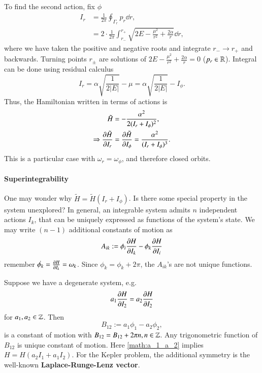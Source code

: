To find the second action, fix $\phi$
\begin{align*}
	I_r &= \frac{1}{2\pi} \oint_{\Gamma_r} p_r \dd{r},	 \\
			 &= 2 \cdot \frac{1}{2\pi}\int_{r_-}^{r_+} \sqrt{2E - \frac{\mu^2}{r^2} + \frac{2\alpha}{r}} \dd{r},
\end{align*}
where we have taken the positive and negative roots and integrate $r_- \rightarrow r_+$ and backwards. Turning points $r_\pm$ are solutions of $2E - \frac{\mu^2}{r^2} + \frac{2\alpha}{r} = 0$ ($p_r \in \mathbb{R}$). Integral can be done using residual calculus 
\begin{equation*}
	I_r = \alpha \sqrt{\frac{1}{2 |E|}} - \mu = \alpha \sqrt{\frac{1}{2 |E|}} - I_\phi.
\end{equation*}
Thus, the Hamiltonian written in terms of actions is
\begin{align*}
	\tilde{H} &= - \frac{\alpha^2}{2(I_r + I_\phi)^2}, \\
	\Rightarrow \pdv{\tilde{H}}{I_r} &= \pdv{\tilde{H}}{I_\phi} = \frac{\alpha^2}{(I_r + I_\phi)^3}.
\end{align*}
This is a particular case with $\omega_r = \omega_\phi$, and therefore closed orbits.


\paragraph{Superintegrability} 
One may wonder why $\tilde{H} = \tilde{H}(I_r + I_\phi) $. Is there some special property in the system unexplored?  In general, an integrable system admits $n$ independent actions $I_k$, that can be uniquely expressed as functions of the system's state. We may write $(n-1)$ additional constants of motion as 
\begin{equation*}
	A_{ik} := \phi_i \pdv{H}{I_k} - \phi_k \pdv{H}{I_i}
\end{equation*}
remember $\dot{\phi_k} = \pdv{H}{I_k} = \omega_k$. Since $\phi_k = \phi_k + 2\pi$, the $A_{ik}$'s are not unique functions.

Suppose we have a degenerate system, e.g.
\begin{equation}
	a_1 \pdv{H}{I_2}	= a_2 \pdv{H}{I_2}
	\label{math:a_1_a_2}
\end{equation}
for $a_1, a_2 \in \mathbb{Z}$. Then 
\begin{equation*}
	B_{12} := a_1 \phi_1 - a_2 \phi_2,
\end{equation*}
is a constant of motion with $B_{12} = B_{12} + 2\pi n, n\in \mathbb{Z}$. Any trigonometric function of $B_{12}$ is unique constant of motion. Here \eqref{math:a_1_a_2} implies $H=H(a_2 I_1 + a_1 I_2)$. For the Kepler problem, the additional symmetry is the well-known \textbf{Laplace-Runge-Lenz vector}.


